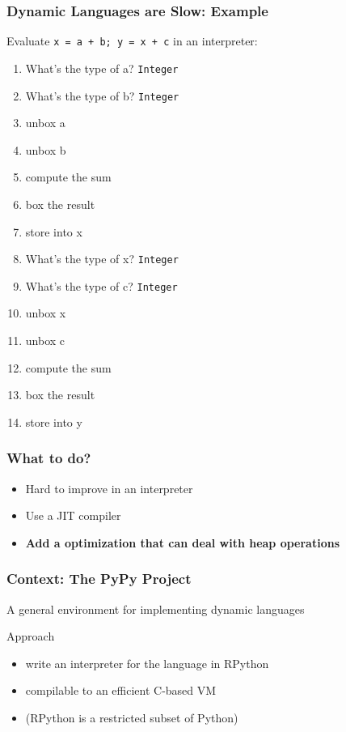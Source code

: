 \documentclass[utf8x]{beamer}
\begin{document}
\begin{frame}
  \frametitle{Dynamic Languages are Slow: Example}
  Evaluate \texttt{x = a + b; y = x + c} in an interpreter:
  \pause
  \begin{enumerate}
      \item What's the type of a? \texttt{Integer}
      \item What's the type of b? \texttt{Integer}
  \pause
      \item unbox a
      \item unbox b
      \item compute the sum
      \item box the result
      \item store into x
  \pause
      \item What's the type of x? \texttt{Integer}
      \item What's the type of c? \texttt{Integer}
  \pause
      \item unbox x
      \item unbox c
      \item compute the sum
      \item box the result
      \item store into y
  \end{enumerate}
\end{frame}

\begin{frame}
  \frametitle{What to do?}
  \begin{itemize}
      \item Hard to improve in an interpreter
      \item Use a JIT compiler
      \item \textbf{Add a optimization that can deal with heap operations}
  \end{itemize}
\end{frame}

\begin{frame}
  \frametitle{Context: The PyPy Project}
  A general environment for implementing dynamic languages
  \pause
  \begin{block}{Approach}
      \begin{itemize}
          \item write an interpreter for the language in RPython
          \item compilable to an efficient C-based VM
          \pause
          \item (RPython is a restricted subset of Python)
      \end{itemize}
  \end{block}
\end{frame}
\end{document}
